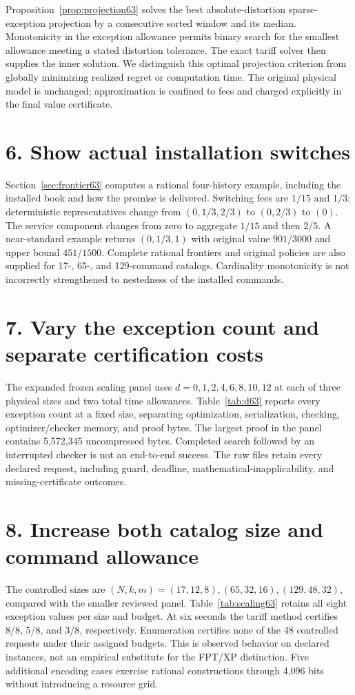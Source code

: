 Proposition~\ref{prop:projection63} solves the best absolute-distortion sparse-exception projection by a consecutive sorted window and its median. Monotonicity in the exception allowance permits binary search for the smallest allowance meeting a stated distortion tolerance. The exact tariff solver then supplies the inner solution. We distinguish this optimal projection criterion from globally minimizing realized regret or computation time. The original physical model is unchanged; approximation is confined to fees and charged explicitly in the final value certificate.

\section*{6. Show actual installation switches}
Section~\ref{sec:frontier63} computes a rational four-history example, including the installed book and how the promise is delivered. Switching fees are $1/15$ and $1/3$: deterministic representatives change from $(0,1/3,2/3)$ to $(0,2/3)$ to $(0)$. The service component changes from zero to aggregate $1/15$ and then $2/5$. A near-standard example returns $(0,1/3,1)$ with original value $901/3000$ and upper bound $451/1500$. Complete rational frontiers and original policies are also supplied for 17-, 65-, and 129-command catalogs. Cardinality monotonicity is not incorrectly strengthened to nestedness of the installed commands.

\section*{7. Vary the exception count and separate certification costs}
The expanded frozen scaling panel uses $d=0,1,2,4,6,8,10,12$ at each of three physical sizes and two total time allowances. Table~\ref{tab:d63} reports every exception count at a fixed size, separating optimization, serialization, checking, optimizer/checker memory, and proof bytes. The largest proof in the panel contains 5,572,345 uncompressed bytes. Completed search followed by an interrupted checker is not an end-to-end success. The raw files retain every declared request, including guard, deadline, mathematical-inapplicability, and missing-certificate outcomes.

\section*{8. Increase both catalog size and command allowance}
The controlled sizes are $(N,k,m)=(17,12,8),(65,32,16),(129,48,32)$, compared with the smaller reviewed panel. Table~\ref{tab:scaling63} retains all eight exception values per size and budget. At six seconds the tariff method certifies 8/8, 5/8, and 3/8, respectively. Enumeration certifies none of the 48 controlled requests under their assigned budgets. This is observed behavior on declared instances, not an empirical substitute for the FPT/XP distinction. Five additional encoding cases exercise rational constructions through 4,096 bits without introducing a resource grid.

